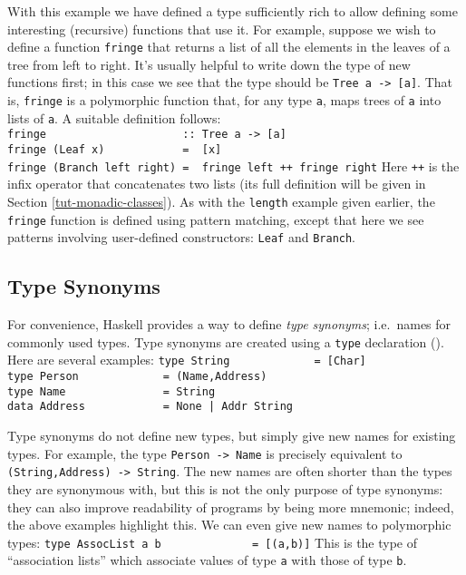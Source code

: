 With this example we have defined a type sufficiently rich to
allow defining some interesting (recursive) functions that use it.
For example, suppose we wish to define a function \mbox{\tt fringe} that
returns a list of all the elements in the leaves of a tree from left
to right.  It's usually helpful to write down the type of new
functions first; in this case we see that the type should be 
\mbox{\tt Tree\ a\ ->\ [a]}.  That is, \mbox{\tt fringe} is a polymorphic function that,
for any type \mbox{\tt a}, maps trees of \mbox{\tt a} into lists of \mbox{\tt a}.  A suitable
definition follows:
\bprog
\mbox{\tt fringe\ \ \ \ \ \ \ \ \ \ \ \ \ \ \ \ \ \ \ \ \ ::\ Tree\ a\ ->\ [a]}\\
\mbox{\tt fringe\ (Leaf\ x)\ \ \ \ \ \ \ \ \ \ \ \ =\ \ [x]}\\
\mbox{\tt fringe\ (Branch\ left\ right)\ =\ \ fringe\ left\ ++\ fringe\ right}
\eprog
Here \mbox{\tt ++} is the infix operator that concatenates two lists (its full
definition will be given in Section \ref{tut-monadic-classes}).  As
with the \mbox{\tt length} example given earlier, the \mbox{\tt fringe} function is
defined using pattern matching, except that here we see patterns involving
user-defined constructors: \mbox{\tt Leaf} and \mbox{\tt Branch}.  


\subsection{Type Synonyms}
\label{tut-type-synonyms}

For convenience, Haskell provides a way to define {\em type synonyms};
i.e.~names for commonly used types.  Type synonyms are created using a
\mbox{\tt type} declaration ().  Here are several
examples:
\bprog
\mbox{\tt type\ String\ \ \ \ \ \ \ \ \ \ \ \ \ =\ [Char]}\\
\mbox{\tt type\ Person\ \ \ \ \ \ \ \ \ \ \ \ \ =\ (Name,Address)}\\
\mbox{\tt type\ Name\ \ \ \ \ \ \ \ \ \ \ \ \ \ \ =\ String}\\
\mbox{\tt data\ Address\ \ \ \ \ \ \ \ \ \ \ \ =\ None\ |\ Addr\ String}
\eprog

Type synonyms do not define new types, but simply give new names
for existing types.  For example, the type \mbox{\tt Person\ ->\ Name} is
precisely equivalent to \mbox{\tt (String,Address)\ ->\ String}.  The new names
are often shorter than the types they are synonymous with, but this is
not the only purpose of type synonyms: they can also improve
readability of programs by being more mnemonic; indeed, the above
examples highlight this.  We can even give new names to polymorphic
types:
\bprog
\mbox{\tt type\ AssocList\ a\ b\ \ \ \ \ \ \ \ \ \ \ \ \ \ =\ [(a,b)]}
\eprog 
This is the type of ``association lists'' which associate values of
type \mbox{\tt a} with those of type \mbox{\tt b}.

